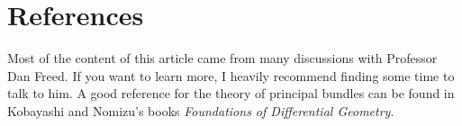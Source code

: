 \documentclass[abstract=on,twoside]{scrreprt}
\begin{document}
\section*{References}
%
Most of the content of this article came from many discussions with Professor Dan
Freed. If you want to learn more, I heavily recommend finding some time to talk to
him. A good reference for the theory of principal bundles can be found in Kobayashi
and Nomizu's books \emph{Foundations of Differential Geometry}.
%
\end{document}
